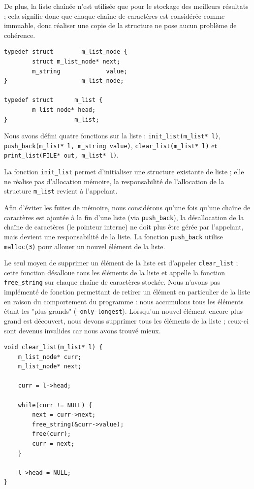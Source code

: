 \documentclass[a4paper,11pt]{article}
\begin{document}
De plus, la liste chaînée n'est utilisée que pour le stockage des meilleurs résultats ; cela signifie donc que chaque chaîne de caractères est considérée comme immuable, donc réaliser une copie de la structure ne pose aucun problème de cohérence.

\begin{verbatim}
typedef struct        m_list_node {
        struct m_list_node* next;
        m_string             value;
}                     m_list_node;

typedef struct      m_list {
        m_list_node* head;
}                   m_list;
\end{verbatim}

Nous avons défini quatre fonctions sur la liste : \texttt{init\_list(m\_list* l)}, \texttt{push\_back(m\_list* l, m\_string value)}, \texttt{clear\_list(m\_list* l)} et \texttt{print\_list(FILE* out, m\_list* l)}.

La fonction \texttt{init\_list} permet d'initialiser une structure existante de liste ; elle ne réalise pas d'allocation mémoire, la responsabilité de l'allocation de la structure \texttt{m\_list} revient à l'appelant.

Afin d'éviter les fuites de mémoire, nous considérons qu'une fois qu'une chaîne de caractères est ajoutée à la fin d'une liste (via \texttt{push\_back}), la désallocation de la chaîne de caractères (le pointeur interne) ne doit plus être gérée par l'appelant, mais devient une responsabilité de la liste. La fonction \texttt{push\_back} utilise \texttt{malloc(3)} pour allouer un nouvel élément de la liste.

Le seul moyen de supprimer un élément de la liste est d'appeler \texttt{clear\_list} ; cette fonction désalloue tous les éléments de la liste et appelle la fonction \texttt{free\_string} sur chaque chaîne de caractères stockée. Nous n'avons pas implémenté de fonction permettant de retirer un élément en particulier de la liste en raison du comportement du programme : nous accumulons tous les éléments étant les "plus grands" (\texttt{--only-longest}). Lorsqu'un nouvel élément encore plus grand est découvert, nous devons supprimer tous les éléments de la liste ; ceux-ci sont devenus invalides car nous avons trouvé mieux.

\begin{verbatim}
void clear_list(m_list* l) {
    m_list_node* curr;
    m_list_node* next;
    
    curr = l->head;

    while(curr != NULL) {
        next = curr->next;
        free_string(&curr->value);
        free(curr);
        curr = next;
    }

    l->head = NULL;
}
\end{verbatim}
\end{document}
